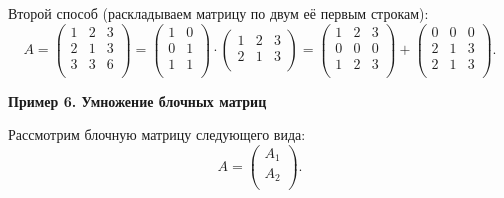 \documentclass[11pt,a4paper]{article}
\begin{document}
    Второй способ (раскладываем матрицу по двум её первым строкам): \[
  A = 
  \begin{pmatrix}
     1 & 2 & 3 \\
     2 & 1 & 3 \\
     3 & 3 & 6 \\
  \end{pmatrix}
  =
  \begin{pmatrix}
     1 & 0 \\
     0 & 1 \\
     1 & 1 \\
  \end{pmatrix}
  \cdot
  \begin{pmatrix}
     1 & 2 & 3 \\
     2 & 1 & 3 \\
  \end{pmatrix}
  =
  \begin{pmatrix}
     1 & 2 & 3 \\
     0 & 0 & 0 \\
     1 & 2 & 3 \\
  \end{pmatrix}
  +
  \begin{pmatrix}
     0 & 0 & 0 \\
     2 & 1 & 3 \\
     2 & 1 & 3 \\
  \end{pmatrix}.
\]

    \textbf{Пример 6. Умножение блочных матриц}

Рассмотрим блочную матрицу следующего вида:
\[ A = \begin{pmatrix} A_1 \\ A_2 \\ \end{pmatrix}. \]
\end{document}
